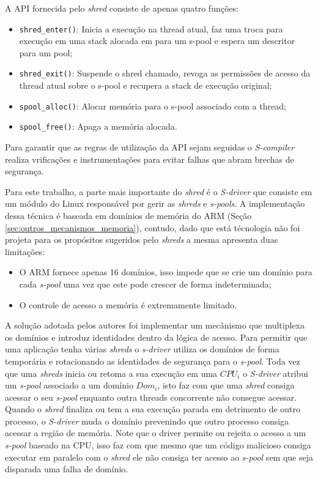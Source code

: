 A API fornecida pelo \emph{shred} consiste de apenas quatro funções:

\begin{itemize}
  \item \texttt{shred\_enter()}: Inicia a execução na thread atual, faz uma
        troca para execução em uma stack alocada em para um s-pool e espera um
        descritor para um pool;
  \item \texttt{shred\_exit()}: Suspende o shred chamado, revoga as permissões
        de acesso da thread atual sobre o s-pool e recupera a stack de execução
        original;
  \item \texttt{spool\_alloc()}: Alocar memória para o s-pool associado com a
        thread;
  \item \texttt{spool\_free()}: Apaga a memória alocada.
\end{itemize}

Para garantir que as regras de utilização da API sejam seguidas o
\emph{S-compiler} realiza vrificações e instrumentações para evitar falhas que
abram brechas de segurança.

Para este trabalho, a parte mais importante do \emph{shred} é o \emph{S-driver}
que consiste em um módulo do Linux responsável por gerir as \emph{shreds} e
\emph{s-pools}. A implementação dessa técnica é baseada em domínios de memória
do ARM (Seção \ref{sec:outros_mecanismos_memoria}), contudo, dado que está
técnologia não foi projeta para os propósitos sugeridos pelo \emph{shreds} a
mesma apresenta duas limitações:

\begin{itemize}
  \item O ARM fornece apenas 16 domínios, isso impede que se crie um domínio
        para cada \emph{s-pool} uma vez que este pode crescer de forma
        indeterminada;
  \item O controle de acesso a memória é extremamente limitado.
\end{itemize}

A solução adotada pelos autores foi implementar um mecânismo que multiplexa os
domínios e introduz identidades dentro da lógica de acesso. Para permitir que
uma aplicação tenha várias \emph{shreds} o \emph{s-driver} utiliza os domínios
de forma temporária e rotacionando as identidades de segurança para o
\emph{s-pool}. Toda vez que uma \emph{shreds} inicia ou retoma a sua execução
em uma $CPU_i$ o \emph{S-driver} atribui um \emph{s-pool} associado a um
domínio $Dom_i$, isto faz com que uma \emph{shred} consiga acessar o seu
\emph{s-pool} enquanto outra threads concorrente não consegue acessar. Quando o
\emph{shred} finaliza ou tem a sua execução parada em detrimento de outro
processo, o \emph{S-driver} muda o domínio prevenindo que outro processo
consiga acessar a região de memória. Note que o driver permite ou rejeita o
acesso a um \emph{s-pool} baseado na CPU, isso faz com que mesmo que um código
malicioso consiga executar em paralelo com o \emph{shred} ele não consiga ter
acesso ao \emph{s-pool} sem que seja disparada uma falha de domínio.

